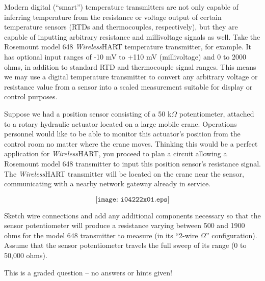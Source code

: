 

Modern digital (``smart'') temperature transmitters are not only capable of inferring temperature from the resistance or voltage output of certain temperature sensors (RTDs and thermocouples, respectively), but they are capable of inputting arbitrary resistance and millivoltage signals as well.  Take the Rosemount model 648 {\sl Wireless}HART temperature transmitter, for example.  It has optional input ranges of -10 mV to +110 mV (millivoltage) and 0 to 2000 ohms, in addition to standard RTD and thermocouple signal ranges.  This means we may use a digital temperature transmitter to convert any arbitrary voltage or resistance value from a sensor into a scaled measurement suitable for display or control purposes.

\vskip 10pt

Suppose we had a position sensor consisting of a 50 k$\Omega$ potentiometer, attached to a rotary hydraulic actuator located on a large mobile crane.  Operations personnel would like to be able to monitor this actuator's position from the control room no matter where the crane moves.  Thinking this would be a perfect application for {\sl Wireless}HART, you proceed to plan a circuit allowing a Rosemount model 648 transmitter to input this position sensor's resistance signal.  The {\sl Wireless}HART transmitter will be located on the crane near the sensor, communicating with a nearby network gateway already in service.

$$\texttt{[image: i04222x01.eps]}$$

Sketch wire connections and add any additional components necessary so that the sensor potentiometer will produce a resistance varying between 500 and 1900 ohms for the model 648 transmitter to measure (in its ``2-wire $\Omega$'' configuration).  Assume that the sensor potentiometer travels the full sweep of its range (0 to 50,000 ohms).

\vfil 

\eject






This is a graded question -- no answers or hints given!






